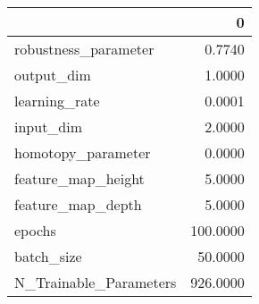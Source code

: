 \begin{tabular}{lr}
\toprule
{} &         0 \\
\midrule
robustness\_parameter   &    0.7740 \\
output\_dim             &    1.0000 \\
learning\_rate          &    0.0001 \\
input\_dim              &    2.0000 \\
homotopy\_parameter     &    0.0000 \\
feature\_map\_height     &    5.0000 \\
feature\_map\_depth      &    5.0000 \\
epochs                 &  100.0000 \\
batch\_size             &   50.0000 \\
N\_Trainable\_Parameters &  926.0000 \\
\bottomrule
\end{tabular}

